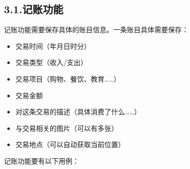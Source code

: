 \documentclass{article}
\begin{document}
\subsection{3.1.\hspace*{0.5em}记账功能}\label{section}%

\noindent{}记账功能需要保存具体的账目信息。一条账目具体需要保存：%

\begin{itemize}[noitemsep,topsep=\mdcompacttopsep]%

\item{}交易时间（年月日时分）%

\item{}交易类型（收入/支出）%

\item{}交易项目（购物、餐饮、教育……）%

\item{}交易金额%

\item{}对这条交易的描述（具体消费了什么……）%

\item{}与交易相关的图片（可以有多张）%

\item{}交易地点（可以自动获取当前位置）%
\end{itemize}%

\noindent{}记账功能要有以下用例：%
\end{document}
